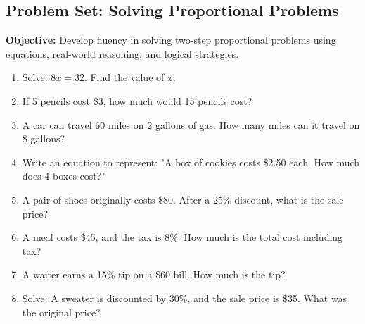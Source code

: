 \documentclass[12pt]{article}
\title{}
\date{}
\begin{document}
\subsection*{Problem Set: Solving Proportional Problems}
\onehalfspacing

\begin{tcolorbox}[colframe=black!40, colback=gray!5, 
coltitle=black, colbacktitle=black!20, fonttitle=\bfseries\Large, 
title=Learning Objective, halign title=center, left=5pt, right=5pt, top=5pt, bottom=15pt]
\textbf{Objective:} Develop fluency in solving two-step proportional problems using equations, real-world reasoning, and logical strategies.
\end{tcolorbox}

\begin{tcolorbox}[colframe=black!60, colback=white, 
coltitle=black, colbacktitle=black!15, fonttitle=\bfseries\Large, 
title=Exercises, halign title=center, left=10pt, right=10pt, top=10pt, bottom=20pt]
\begin{enumerate}[itemsep=3em]
    \item Solve: \(8x = 32\). Find the value of \(x\).
    \item If 5 pencils cost \$3, how much would 15 pencils cost?
    \item A car can travel 60 miles on 2 gallons of gas. How many miles can it travel on 8 gallons?
    \item Write an equation to represent: "A box of cookies costs \$2.50 each. How much does 4 boxes cost?"
    \item A pair of shoes originally costs \$80. After a 25\% discount, what is the sale price?
    \item A meal costs \$45, and the tax is 8\%. How much is the total cost including tax?
    \item A waiter earns a 15\% tip on a \$60 bill. How much is the tip?
    \item Solve: A sweater is discounted by 30\%, and the sale price is \$35. What was the original price?
\end{enumerate}
\end{tcolorbox}
\end{document}
